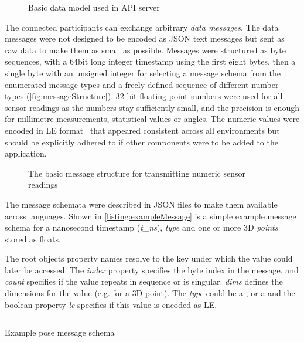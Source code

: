 \begin{figure}[!ht]
\centering

\caption[API data model]{Basic data model used in API server\protect}
\label{fig:apiDataModel}
\end{figure}

The connected participants can exchange arbitrary \emph{data messages}.
The data messages were not designed to be encoded as \ac{JSON} text messages but sent as raw data to make them as small as possible.
Messages were structured as byte sequences, with a 64bit long integer timestamp using the first eight bytes, then a single byte with an unsigned integer for selecting a message schema from the enumerated message types and a freely defined sequence of different number types (\autoref{fig:messageStructure}).
32-bit floating point numbers were used for all sensor readings as the numbers stay sufficiently small, and the precision is enough for millimetre measurements, statistical values or angles.
The numeric values were encoded in \ac{LE} format~\parencite{cohenEndianess} that appeared consistent across all environments but should be explicitly adhered to if other components were to be added to the application.

\begin{figure}[!ht]
\centering

\caption[Generic Message Structure]{The basic message structure for transmitting numeric sensor readings\protect}
\label{fig:messageStructure}
\end{figure}

The message schemata were described in \ac{JSON} files to make them available across languages.
Shown in \autoref{listing:exampleMessage} is a simple example message schema for a nanosecond timestamp (\emph{{t\_ns}}), \emph{type} and one or more \ac{3D} \emph{points} stored as floats.

The root object\textquotesingle s property names resolve to the key under which the value could later be accessed.
The \emph{index} property specifies the byte index in the message, and \emph{count} specifies if the value repeats in sequence or is singular. \emph{dims} defines the dimensions for the value (e.g.  for a \ac{3D} point).
The \emph{type} could be a ,  or a  and the boolean property \emph{le} specifies if this value is encoded as \ac{LE}.

\begin{listing}[!ht]
\inputminted{json}{04_Artefakte/03_Listings/example-pose-message.json}
\caption{Example pose message schema}
\label{listing:exampleMessage}
\end{listing}

